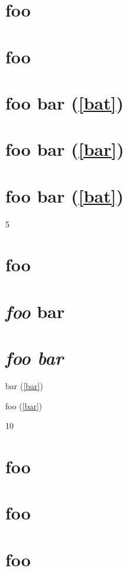 
\def\mytitle{Advanced Headers}


\part{foo}
\label{bar}

\part{foo}
\label{bar}

\part{foo bar (\autoref{bat})}
\label{foobarbat}

\part{foo bar (\autoref{bar})}
\label{bat}

\part{foo bar (\autoref{bat})}
\label{baz}

5

\part{foo}
\label{bar}

\part{\emph{foo} bar}
\label{foobar}

\part{\emph{foo
bar}}
\label{foobar}

bar (\autoref{bar})

foo (\autoref{bar})

10

\part{foo}
\label{bar}

\part{foo}
\label{bar}

\part{foo}
\label{bar}




